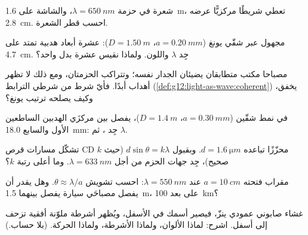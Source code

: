 \begin{exercise}[$\star\star$]\label{exo:g12:light-as-wave:6}
شعرة في حزمة $\lambda = \qty{650}{nm}$، والشاشة على \qty{1.6}{m}،
تعطي شريطًا مركزيًّا عرضه \qty{2.8}{cm}. احسب قطر الشعرة.
\end{exercise}

\begin{exercise}[$\star\star$]\label{exo:g12:light-as-wave:7}
 مجهول عبر شقّي يونغ ($a = \qty{0.20}{mm}$،
$D = \qty{1.50}{m}$): عشرة أبعاد هدبية تمتد على \qty{4.7}{cm}. جِد
$\lambda$ واللون. ولماذا نقيس عشرة بدل واحد؟
\end{exercise}

\begin{exercise}[$\star\star$]\label{exo:g12:light-as-wave:8}
مصباحا مكتب متطابقان يضيئان الجدار نفسه؛ وتتراكب الحزمتان، ومع ذلك
لا تظهر أهداب أبدًا. فأيّ شرط من شرطي الترابط
(\cref{def:g12:light-as-wave:coherent}) يخفق، وكيف يصلحه ترتيب
يونغ؟
\end{exercise}

\begin{exercise}[$\star\star$]\label{exo:g12:light-as-wave:9}
في نمط شقّين ($a = \qty{0.30}{mm}$، $D = \qty{1.4}{m}$)، يفصل بين
مركزَي الهدبين الساطعين الأول والسابع \qty{18.0}{mm}:
جِد ، ثم $\lambda$.
\end{exercise}

\begin{exercise}[$\star\star$]\label{exo:g12:light-as-wave:10}
تشكّل مسارات قرص CD محزّزًا تباعده $d = \qty{1.6}{\micro m}$.
وبقبول $d \sin\theta = k\lambda$ (حيث $k$ صحيح)، جِد
جهات الحزم من أجل $\lambda = \qty{633}{nm}$. وما أعلى رتبة $k$؟
\end{exercise}

\begin{exercise}[$\star\star$]\label{exo:g12:light-as-wave:11}
مقراب فتحته $a = \qty{10}{cm}$ عند $\lambda =
\qty{550}{nm}$: احسب تشويش  $\theta \approx
\lambda/a$. وهل يقدر أن يفصل مصباحَي سيارة يفصل بينهما \qty{1.5}{m}،
على بعد \qty{100}{km}؟
\end{exercise}

\begin{exercise}[$\star\star\star$]\label{exo:g12:light-as-wave:12}
غشاء صابوني عمودي ينزّ، فيصير أسمك في الأسفل، ويُظهر
أشرطة ملوّنة أفقية تزحف إلى أسفل. اشرح: لماذا الألوان، ولماذا
الأشرطة، ولماذا الحركة. (بلا حساب.)
\end{exercise}

